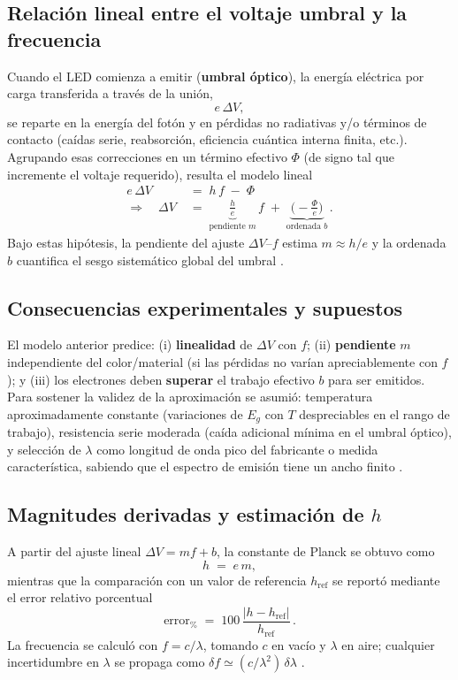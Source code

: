 \documentclass[11pt,twocolumn]{article}
\makeatletter
\let\orig@cite\cite
\renewcommand{\cite}[1]{\textcolor{Blue}{\orig@cite{#1}}}
\let\orig@parencite\parencite
\renewcommand{\parencite}[1]{\textcolor{Blue}{\orig@parencite{#1}}}
\renewcommand{\cite}[1]{\parencite{#1}}      %
\let\orig@cite\cite
\renewcommand{\cite}[1]{\textcolor{Blue}{\orig@cite{#1}}} %
\makeatother
\begin{document}
\subsection*{Relación lineal entre el voltaje umbral y la frecuencia}
Cuando el LED comienza a emitir (\textbf{umbral óptico}), la energía eléctrica por carga transferida a través de la unión,
\begin{equation*}
    e\,\Delta V,
\end{equation*}
se reparte en la energía del fotón y en pérdidas no radiativas y/o términos de contacto (caídas serie, reabsorción, eficiencia cuántica interna finita, etc.). Agrupando esas correcciones en un término efectivo \(\Phi\) (de signo tal que incremente el voltaje requerido), resulta el modelo lineal
\begin{align*}
    e\,\Delta V \;&=\; h\,f \;-\; \Phi \\[4pt]
    \Longrightarrow\quad
    \Delta V \;&=\; \underbrace{\frac{h}{e}}_{\text{pendiente } m}\, f \;+\; \underbrace{\Big(-\frac{\Phi}{e}\Big)}_{\text{ordenada } b}\,.
\end{align*}
Bajo estas hipótesis, la pendiente del ajuste \(\Delta V\)–\(f\) estima \(m \approx h/e\) y la ordenada \(b\) cuantifica el sesgo sistemático global del umbral \cite{einstein1905photo,griffiths_em}.

\subsection*{Consecuencias experimentales y supuestos}
El modelo anterior predice: (i) \textbf{linealidad} de \(\Delta V\) con \(f\); (ii) \textbf{pendiente} \(m\) independiente del color/material (si las pérdidas no varían apreciablemente con \(f\)); y (iii) los electrones deben \textbf{superar} el trabajo efectivo \(b\) para ser emitidos. Para sostener la validez de la aproximación se asumió: temperatura aproximadamente constante (variaciones de \(E_g\) con \(T\) despreciables en el rango de trabajo), resistencia serie moderada (caída adicional mínima en el umbral óptico), y selección de \(\lambda\) como longitud de onda pico del fabricante o medida característica, sabiendo que el espectro de emisión tiene un ancho finito \cite{schubert_leds,hecht_optics}.

\subsection*{Magnitudes derivadas y estimación de \(h\)}
A partir del ajuste lineal \(\Delta V = m f + b\), la constante de Planck se obtuvo como
\begin{equation*}
    h \;=\; e\,m,
\end{equation*}
mientras que la comparación con un valor de referencia \(h_{\mathrm{ref}}\) se reportó mediante el error relativo porcentual
\begin{equation*}
    \mathrm{error}_{\%} \;=\; 100\,\frac{\lvert h - h_{\mathrm{ref}}\rvert}{h_{\mathrm{ref}}}\,.
\end{equation*}
La frecuencia se calculó con \( f=c/\lambda \), tomando \(c\) en vacío y \(\lambda\) en aire; cualquier incertidumbre en \(\lambda\) se propaga como \( \delta f \simeq (c/\lambda^2)\,\delta\lambda \) \cite{hecht_optics}.
\end{document}

